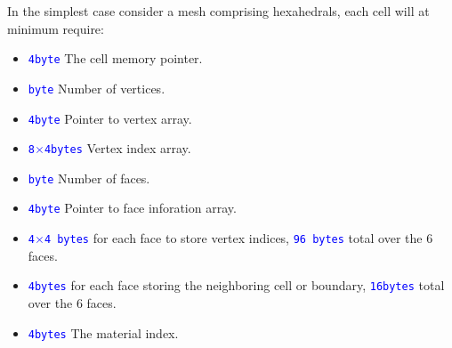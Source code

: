 \documentclass[11pt,letterpaper,titlepage]{article}
\newcommand{\xmltag}[1]{\textcolor{blue}{ \texttt{#1}} }
\newcommand{\stimes}{{\times}}
\numberwithin{equation}{section}
\begin{document}
\newpage
In the simplest case consider a mesh comprising hexahedrals, each cell will at minimum require:

\begin{itemize}[noitemsep]
\item \xmltag{4byte} The cell memory pointer.
\item \xmltag{byte} Number of vertices.
\item \xmltag{4byte} Pointer to vertex array.
\item \xmltag{8$\stimes$4bytes} Vertex index array.
\item \xmltag{byte} Number of faces.
\item \xmltag{4byte} Pointer to face inforation array.
\item \xmltag{4$\stimes$4 bytes} for each face to store vertex indices, \xmltag{96 bytes} total over the 6 faces.
\item \xmltag{4bytes} for each face storing the neighboring cell or boundary, \xmltag{16bytes} total over the 6 faces.
\item \xmltag{4bytes} The material index.
\end{itemize}
\end{document}
